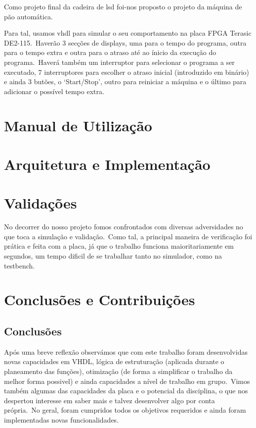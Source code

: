 \documentclass{report}
\begin{document}
Como projeto final da cadeira de \ac{lsd} foi-nos proposto o projeto da máquina de pão automática.

Para tal, usamos \ac{vhdl} para simular o seu comportamento na placa FPGA Terasic DE2-115.\ Haverão 3 secções de displays, uma para o tempo do programa, outra para o tempo extra e outra para o atraso até ao ínicio da execução do programa.\ Haverá também um interruptor para selecionar o programa a ser executado, 7 interruptores para escolher o atraso inicial (introduzido em binário) e ainda 3 butões, o `Start/Stop', outro para reiniciar a máquina e o último para adicionar o possível tempo extra.\\

\chapter{Manual de Utilização}
\label{ch:manual-de-utilizacao}


\chapter{Arquitetura e Implementação}
\label{ch:arquitetura-e-implementacao}


\chapter{Validações}
\label{ch:validacoes}
No decorrer do nosso projeto fomos confrontados com diversas adversidades no que toca a simulação e validação.\ Como tal, a principal maneira de verificação foi prática e feita com a placa, já que o trabalho funciona maioritariamente em segundos, um tempo dificil de se trabalhar tanto no simulador, como na testbench.

\chapter{Conclusões e Contribuições}
\label{ch:conclusoes-e-contribuicoes}

\section{Conclusões}
\label{sec:conclusoes}
Após uma breve reflexão observámos que com este trabalho foram desenvolvidas novas capacidades em VHDL, lógica de estruturação (aplicada durante o planeamento das funções), otimização (de forma a simplificar o trabalho da melhor forma possivel) e ainda capacidades a nível de trabalho em grupo.\ Vimos também algumas das capacidades da placa e o potencial da disciplina, o que nos despertou interesse em saber mais e talvez desenvolver algo por conta própria.\ No geral, foram cumpridos todos os objetivos requeridos e ainda foram implementadas novas funcionalidades.
\end{document}

